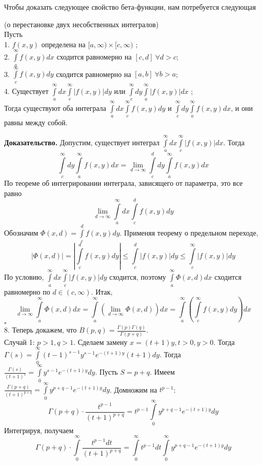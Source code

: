 Чтобы доказать следующее свойство бета-функции, нам потребуется следующая
\begin{theor}
    (о перестановке двух несобственных интегралов)\\
    Пусть\\
    1. $f(x,y)$ определена на $[a,\infty)\times [c,\infty)$ ;\\
    2. $\int\limits_{a}^{\infty}f(x,y)dx$ сходится равномерно на 
    $[c,d]~\forall d>c$;\\
    3. $\int\limits_{c}^{\infty}f(x,y)dy$ сходится равномерно на 
    $[a,b]~\forall b>a$;\\
    4. Существует $\int\limits_{a}^{\infty}dx \int\limits_{c}^{\infty}
    |f(x,y)|dy$ или  $\int\limits_{c}^{\infty}dy \int\limits_{a}^{\infty}
    |f(x,y)|dx$ ;\\
    Тогда существуют  оба интеграла 
    $\int\limits_{a}^{\infty}dx \int\limits_{c}^{\infty}f(x,y)dy$
    и  $\int\limits_{c}^{\infty}dy \int\limits_{a}^{\infty}f(x,y)dx$,
    и они равны между собой. 
\end{theor}
\textbf{Доказательство.} Допустим, существует интеграл  
$\int\limits_{a}^{\infty}dx \int\limits_{c}^{\infty}|f(x,y)|dx$.
Тогда 
$$\int\limits_{c}^{\infty}dy \int\limits_{a}^{\infty}f(x,y)dx=
\lim\limits_{d \to \infty} \int\limits_{c}^{d} dy \int\limits_{a}^{\infty} 
f(x,y)dx$$
По теореме об интегрировании интеграла, зависящего от параметра, это все равно
$$\lim\limits_{d \to \infty}\int\limits_{a}^{\infty}dx
\int\limits_{c}^{d}f(x,y)dy$$
Обозначим $\Phi(x,d)=\int\limits_{c}^{d}f(x,y)dy$. Применяя теорему о 
предельном переходе, 
$$|\Phi(x,d)|=\left| \int\limits_{c}^{d} f(x,y)dy \right|\leqslant 
\int\limits_{c}^{d} |f(x,y)|dy\leqslant \int\limits_{c}^{\infty}|f(x,y)|dy
$$
По условию, $\int\limits_{a}^{\infty}dx \int\limits_{c}^{\infty}|f(x,y)|dy$ 
сходится, поэтому $\int\limits_{a}^{\infty}\Phi(x,d)dx$ сходится 
равномерно по $d\in (c,\infty)$. Итак,
$$\lim\limits_{d \to \infty}\int\limits_{a}^{\infty}\Phi(x,d)dx=
\int\limits_{a}^{\infty} \left( \lim\limits_{d \to \infty}\Phi(x,d)\right)dx=
\int\limits_{a}^{\infty}\left( \int\limits_{c}^{\infty}f(x,y)dy \right)dx $$
$\square$ \\

8. Теперь докажем, что ${B(p,q)=\frac{\Gamma(p)\Gamma(q)}{\Gamma(p+q)}}$.\\
Случай 1: $p>1,q>1$.  %
Сделаем замену $x=(t+1)y,t>0,y>0$. Тогда
$\Gamma(s)=\int\limits_{0}^{\infty}(t-1)^{s-1}y^{s-1}e^{-(t+1)y}(t+1)dy$.
Тогда $\frac{\Gamma(s)}{(t+1)^s}=\int\limits_{0}^{\infty}y^{s-1}
e^{-(t+1)y}dy$. Пусть $S=p+q$. Имеем
$\frac{\Gamma(p+q)}{(t+1)^{p+q}}=\int\limits_{0}^{\infty}y^{p+q-1}e^{-(t+1)y}
dy$. Домножим на $t^{p-1}$:
$$\Gamma(p+q)\cdot \frac{t^{p-1}}{(t+1)^{p+q}}=t^{p-1}
\int\limits_{0}^{\infty}y^{p+q-1}e^{-(t+1)y}dy$$
Интегрируя, получаем
\begin{equation} \label{gamma_beta}
\Gamma(p+q)\cdot \int\limits_{0}^{\infty} \frac{t^{p-1}dt}{(t+1)^{p+q}}=
\int\limits_{0}^{\infty}t^{p-1}dt \int\limits_{0}^{\infty}y^{p+q-1}
e^{-(t+1)y}dy
\end{equation}

